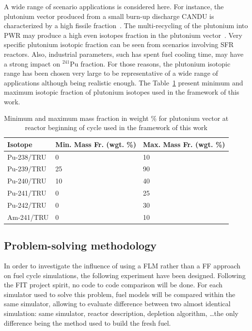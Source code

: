 A wide range of scenario applications is considered here. For instance, the plutonium vector produced from a small burn-up discharge CANDU is characterized by a high fissile fraction~\cite{Guillemin_2010}. The multi-recycling of the plutonium into PWR may produce a high even isotopes fraction in the plutonium vector~\cite{Courtin_2016}. Very specific plutonium isotopic fraction can be seen from scenarios involving SFR reactors. Also, industrial parameters, such has spent fuel cooling time, may have a strong impact on $^{241}$Pu fraction. For those reasons, the plutonium isotopic range has been chosen very large to be representative of a wide range of applications although being realistic enough. The Table~\ref{Tab:PuVector} present minimum and maximum isotopic fraction of plutonium isotopes used in the framework of this work.

\begin{table}[h]
\centering
\begin{tabular}{ |l|l|l| }
  \hline
  Isotope & Min. Mass Fr. (wgt. \%) & Max. Mass Fr. (wgt. \%) \\
  \hline
  Pu-238/TRU & 0  & 10 \\
  \hline
  Pu-239/TRU & 25 & 90 \\
  \hline
  Pu-240/TRU & 10 & 40 \\
  \hline
  Pu-241/TRU & 0  & 25 \\
  \hline
  Pu-242/TRU & 0  & 30 \\
  \hline
  Am-241/TRU & 0  & 10 \\
  \hline
\end{tabular}
\label{Tab:PuVector}
\caption{Minimum and maximum mass fraction in weight \% for plutonium vector at reactor beginning of cycle used in the framework of this work}
\end{table}

\subsection{Problem-solving methodology}

In order to investigate the influence of using a \gls{FLM} rather than a
\gls{FF} approach on fuel cycle simulations, the following experiment have been
designed. Following the FIT project spirit, no code to code comparison will be
done. For each simulator used to solve this problem, fuel models will be
compared within the same simulator, allowing to evaluate difference between two
almost identical simulation: same simulator, reactor description, depletion
algorithm, \ldots the only difference being the method used to build the fresh fuel.

